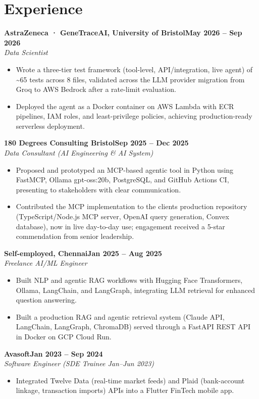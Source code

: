 \documentclass[a4paper,10pt]{article}
\newcommand{\entry}[4]{\noindent\textbf{#1}\hfill\textbf{#2}\\ \textit{#3}\hfill\textit{#4}\par}
\begin{document}
\section{Experience}
\entry{AstraZeneca · GeneTraceAI, University of Bristol}{May 2026 – Sep 2026}{Data Scientist}{}
\begin{itemize}
  \item Wrote a three-tier test framework (tool-level, API/integration, live agent) of \textasciitilde{}65 tests across 8 files, validated across the LLM provider migration from Groq to AWS Bedrock after a rate-limit evaluation.
  \item Deployed the agent as a Docker container on AWS Lambda with ECR pipelines, IAM roles, and least-privilege policies, achieving production-ready serverless deployment.
\end{itemize}
\vspace{3pt}
\entry{180 Degrees Consulting Bristol}{Sep 2025 – Dec 2025}{Data Consultant (AI Engineering \& AI System)}{}
\begin{itemize}
  \item Proposed and prototyped an MCP-based agentic tool in Python using FastMCP, Ollama gpt-oss:20b, PostgreSQL, and GitHub Actions CI, presenting to stakeholders with clear communication.
  \item Contributed the MCP implementation to the client\textquotesingle{}s production repository (TypeScript/Node.js MCP server, OpenAI query generation, Convex database), now in live day-to-day use; engagement received a 5-star commendation from senior leadership.
\end{itemize}
\vspace{3pt}
\entry{Self-employed, Chennai}{Jan 2025 – Aug 2025}{Freelance AI/ML Engineer}{}
\begin{itemize}
  \item Built NLP and agentic RAG workflows with Hugging Face Transformers, Ollama, LangChain, and LangGraph, integrating LLM retrieval for enhanced question answering.
  \item Built a production RAG and agentic retrieval system (Claude API, LangChain, LangGraph, ChromaDB) served through a FastAPI REST API in Docker on GCP Cloud Run.
\end{itemize}
\vspace{3pt}
\entry{Avasoft}{Jan 2023 – Sep 2024}{Software Engineer (SDE Trainee Jan–Jun 2023)}{}
\begin{itemize}
  \item Integrated Twelve Data (real-time market feeds) and Plaid (bank-account linkage, transaction imports) APIs into a Flutter FinTech mobile app.
\end{itemize}
\end{document}
